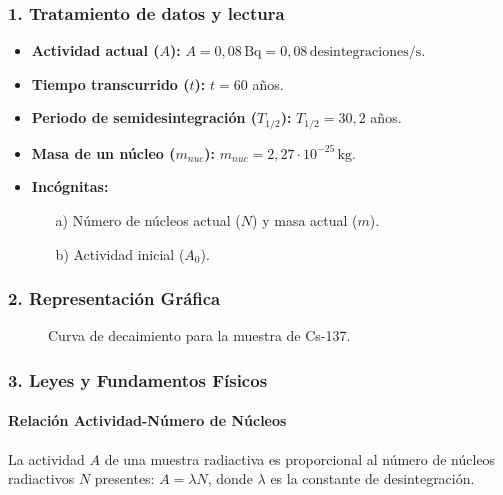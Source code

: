 \subsubsection*{1. Tratamiento de datos y lectura}
\begin{itemize}
    \item \textbf{Actividad actual ($A$):} $A = 0,08 \, \text{Bq} = 0,08 \, \text{desintegraciones/s}$.
    \item \textbf{Tiempo transcurrido ($t$):} $t = 60$ años.
    \item \textbf{Periodo de semidesintegración ($T_{1/2}$):} $T_{1/2} = 30,2$ años.
    \item \textbf{Masa de un núcleo ($m_{nuc}$):} $m_{nuc} = 2,27 \cdot 10^{-25} \, \text{kg}$.
    \item \textbf{Incógnitas:}
    \begin{itemize}
        \item[a)] Número de núcleos actual ($N$) y masa actual ($m$).
        \item[b)] Actividad inicial ($A_0$).
    \end{itemize}
\end{itemize}

\subsubsection*{2. Representación Gráfica}
\begin{figure}[H]
    \centering
    \caption{Curva de decaimiento para la muestra de Cs-137.}
\end{figure}

\subsubsection*{3. Leyes y Fundamentos Físicos}
\paragraph*{Relación Actividad-Número de Núcleos}
La actividad $A$ de una muestra radiactiva es proporcional al número de núcleos radiactivos $N$ presentes: $A = \lambda N$, donde $\lambda$ es la constante de desintegración.
